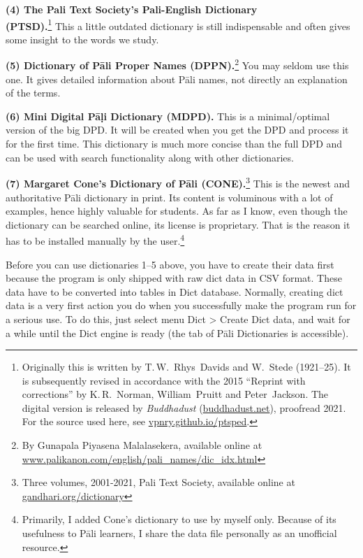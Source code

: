 \textbf{(4) The Pali Text Society's Pali-English Dictionary \\(PTSD).}\footnote{Originally this is written by T.\,W.\ Rhys\ Davids and W.\ Stede (1921--25). It is subsequently revised in accordance with the 2015 ``Reprint with corrections'' by K.\,R.\ Norman, William\ Pruitt and Peter\ Jackson. The digital version is released by \emph{Buddhadust} (\url{buddhadust.net}), proofread 2021. For the source used here, see \url{vpnry.github.io/ptsped}.} This a little outdated dictionary is still indispensable and often gives some insight to the words we study.

\textbf{(5) Dictionary of Pāli Proper Names (DPPN).}\footnote{By Gunapala Piyasena Malalasekera, available online at \url{www.palikanon.com/english/pali\_names/dic\_idx.html}} You may seldom use this one. It gives detailed information about Pāli names, not directly an explanation of the terms.

\textbf{(6) Mini Digital Pāḷi Dictionary (MDPD).} This is a minimal/optimal version of the big DPD. It will be created when you get the DPD and process it for the first time. This dictionary is much more concise than the full DPD and can be used with search functionality along with other dictionaries.

\textbf{(7) Margaret Cone's Dictionary of Pāli (CONE).}\footnote{Three volumes, 2001-2021, Pali Text Society, available online at \url{gandhari.org/dictionary}} This is the newest and authoritative Pāli dictionary in print. Its content is voluminous with a lot of examples, hence highly valuable for students. As far as I know, even though the dictionary can be searched online, its license is proprietary. That is the reason it has to be installed manually by the user.\footnote{Primarily, I added Cone's dictionary to use by myself only. Because of its usefulness to Pāli learners, I share the data file personally as an unofficial resource.}

Before you can use dictionaries 1--5 above, you have to create their data first because the program is only shipped with raw dict data in CSV format. These data have to be converted into tables in Dict database. Normally, creating dict data is a very first action you do when you successfully make the program run for a serious use. To do this, just select menu Dict > {\faSix {}} Create Dict data, and wait for a while until the Dict engine is ready (the tab of Pāli Dictionaries is accessible).

